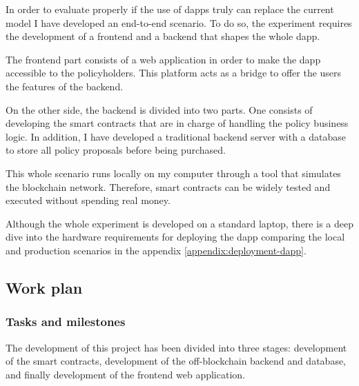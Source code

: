 {In order to evaluate properly if the use of dapps truly can replace the current model I have developed an end-to-end scenario. To do so, the experiment requires the development of a frontend and a backend that shapes the whole dapp.

The frontend part consists of a web application in order to make the dapp accessible to the policyholders. This platform acts as a bridge to offer the users the features of the backend.

On the other side, the backend is divided into two parts. One consists of developing the smart contracts that are in charge of handling the policy business logic. In addition, I have developed a traditional backend server with a database to store all policy proposals before being purchased. 

This whole scenario runs locally on my computer through a tool that simulates the blockchain network. Therefore, smart contracts can be widely tested and executed without spending real money.

Although the whole experiment is developed on a standard laptop, there is a deep dive into the hardware requirements for deploying the dapp comparing the local and production scenarios in the appendix \ref{appendix:deployment-dapp}. 
}

\subsection{Work plan}

\subsubsection{Tasks and milestones}

{The development of this project has been divided into three stages: development of the smart contracts, development of the off-blockchain backend and database, and finally development of the frontend web application.}

